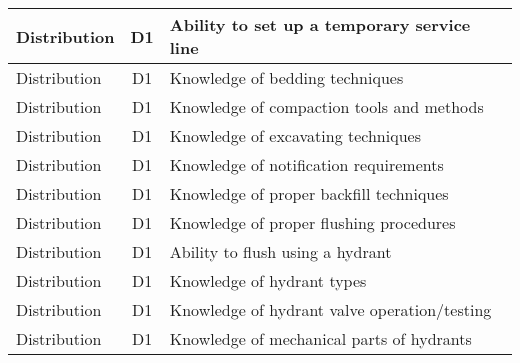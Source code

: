 \documentclass{article}
\begin{document}
\begin{table}[]
\begin{tabular}{|l|c|l|}
Distribution                           & D1             & Ability to set up a   temporary service line                                                                                      \\ \hline
Distribution                           & D1             & Knowledge of bedding   techniques                                                                                                 \\ \hline
Distribution                           & D1             & Knowledge of   compaction tools and methods                                                                                       \\ \hline
Distribution                           & D1             & Knowledge of   excavating techniques                                                                                              \\ \hline
Distribution                           & D1             & Knowledge of   notification requirements                                                                                          \\ \hline
Distribution                           & D1             & Knowledge of proper   backfill techniques                                                                                         \\ \hline
Distribution                           & D1             & Knowledge of proper   flushing procedures                                                                                         \\ \hline
Distribution                           & D1             & Ability to flush   using a hydrant                                                                                                \\ \hline
Distribution                           & D1             & Knowledge of hydrant   types                                                                                                      \\ \hline
Distribution                           & D1             & Knowledge of hydrant   valve operation/testing                                                                                    \\ \hline
Distribution                           & D1             & Knowledge of   mechanical parts of hydrants                                                                                       \\ \hline

\end{tabular}
\end{table}
\end{document}
